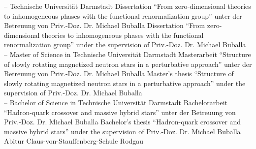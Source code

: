 \documentclass[color=TUDa-1b]{komacv}
\begin{document}
\cventry%
	{--}%
	{}{Technische Universität Darmstadt}%
	{}{}%
	{\lang%
		{Dissertation ``From zero-dimensional theories to inhomogeneous phases with the functional renormalization group'' unter der Betreuung von Priv.-Doz. Dr. Michael Buballa}%
		{Dissertation ``From zero-dimensional theories to inhomogeneous phases with the functional renormalization group'' under the supervision of Priv.-Doz. Dr. Michael Buballa}\\
		\gradePhD{}
	}
\cventry%
	{--}%
	{Master of Science in }%
	{Technische Universität Darmstadt}%
	{}{}%
	{\lang%
		{Masterarbeit ``Structure of slowly rotating magnetized neutron stars in a perturbative approach'' unter der Betreuung von Priv.-Doz. Dr. Michael Buballa}%
		{Master’s thesis ``Structure of slowly rotating magnetized neutron stars in a perturbative approach'' under the supervision of Priv.-Doz. Dr. Michael Buballa}\\
		\gradeMSc{}
	}
\cventry%
	{--}%
	{Bachelor of Science in }%
	{Technische Universität Darmstadt}%
	{}{}%
	{\lang%
		{Bachelorarbeit ``Hadron-quark crossover and massive hybrid stars'' unter der Betreuung von Priv.-Doz. Dr. Michael Buballa}%
		{Bachelor’s thesis ``Hadron-quark crossover and massive hybrid stars'' under the supervision of Priv.-Doz. Dr. Michael Buballa}\\
		\gradeBSc{}
	}
\cventry%
	{}%
	{Abitur}%
	{Claus-von-Stauffenberg-Schule Rodgau}
	{}{}%
	{\gradeAbi{}}



\end{document}
